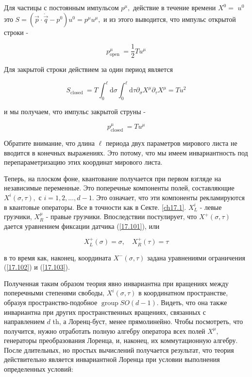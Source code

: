 \documentclass[main.tex]{subfiles}
\begin{document}
Для частицы с постоянным импульсом $p^{\mu},$ действие в течение времени $X^{0}=$
$u^{0}$ это $S=\left(\vec{p} \cdot \dot{\vec{q}}-p^{0}\right) u^{0}=p^{\mu} u^{\mu},$ и из этого выводится, что импульс открытой строки -

\begin{equation}\label{17.107}
p_{\text {open }}^{\mu}=\frac{1}{2} T u^{\mu}
\end{equation}

Для закрытой строки действием за один период является

\begin{equation}\label{17.108}
S_{\text {closed }}=T \int_{0}^{\ell} \mathrm{d} \sigma \int_{0}^{\ell} \mathrm{d} \tau \partial_{\sigma} X^{\mu} \partial_{\tau} X^{\mu}=T u^{2}
\end{equation}

и мы получаем, что импульс закрытой струны -

\begin{equation}\label{17.109}
p_{\text {closed }}^{\mu}=T u^{\mu}
\end{equation}


Обратите внимание, что длина $\ell$ периода двух параметров мирового листа не вводится в конечных выражениях. Это потому, что мы имеем инвариантность под перепараметризацию этих координат мирового листа.

Теперь, на плоском фоне, квантование получается при первом взгляде на независимые переменные. Это поперечные компоненты полей, составляющие $X^{i}(\sigma, \tau),$ с $i=1,2, \ldots, d-1 .$ Это означает, что эти компоненты рекламируются в квантовые операторы. Все в точности как в Секте. \ref{ch17.1}. $X_{L}^{i}$ - левые грузчики, $X_{R}^{\mu}$ - правые грузчики. Впоследствии постулирует, что $X^{+}(\sigma, \tau)$ дается уравнением фиксации датчика (\ref{17.101}), или

\begin{equation}\label{17.110}
X_{L}^{+}(\sigma)=\sigma, \quad X_{R}^{+}(\tau)=\tau
\end{equation}

в то время как, наконец, координата $X^{-}(\sigma, \tau)$ задана уравнениями ограничения (\ref{17.102}) и (\ref{17.103}).

Полученная таким образом теория явно инвариантна при вращениях между поперечными степенями свободы, $X^{i}(\sigma, \tau)$ в координатном пространстве, образуя пространство-подобное $\operatorname{group} S O(d-1) .$ Видеть, что она также инвариантна при других пространственных вращениях, связанных с направлением $d$ th, а Лоренц-буст, менее прямолинейно. Чтобы посмотреть, что получится, нужно отработать полную алгебру оператора всех полей $X^{\mu},$ генераторы преобразования Лоренца, и, наконец, их коммутационную алгебру. После длительных, но простых вычислений получается результат, что теория действительно является инвариантной Лоренца при условии выполнения определенных условий:
\end{document}
